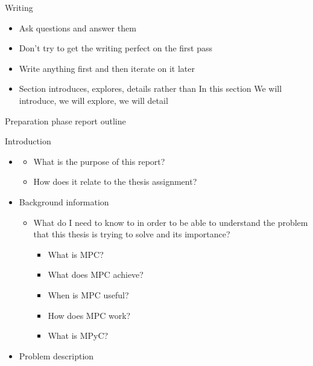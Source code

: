 \label{notes__04000-writing.md}
\begin{frame}{Writing}
\label{notes__04000-writing.md__writing}
\begin{itemize}
\item
  Ask questions and answer them
\item
  Don't try to get the writing perfect on the first pass
\item
  Write anything first and then iterate on it later
\item
  Section introduces, explores, details rather than In this section We will introduce, we will explore, we will detail
\end{itemize}
\end{frame}

\label{notes__05000-prep.md}
\begin{frame}{Preparation phase report outline}
\label{notes__05000-prep.md__preparation-phase-report-outline}
\begin{block}{Introduction}
\label{notes__05000-prep.md__introduction}
\begin{itemize}
\tightlist
\item
  \begin{itemize}
  \tightlist
  \item
    What is the purpose of this report?
  \item
    How does it relate to the thesis assignment?
  \end{itemize}
\item
  Background information

  \begin{itemize}
  \tightlist
  \item
    What do I need to know to in order to be able to understand the problem that this thesis is trying to solve and its importance?

    \begin{itemize}
    \tightlist
    \item
      What is MPC?
    \item
      What does MPC achieve?
    \item
      When is MPC useful?
    \item
      How does MPC work?
    \item
      What is MPyC?
    \end{itemize}
  \end{itemize}
\item
  Problem description


\end{itemize}
\end{block}
\end{frame}
